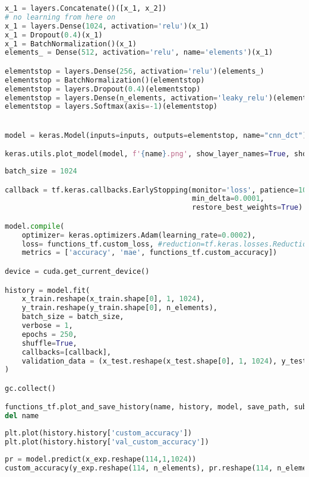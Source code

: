 \begin{lstlisting}[language=Python]
x_1 = layers.Concatenate()([x_1, x_2])
# no learning from here on
x_1 = layers.Dense(1024, activation='relu')(x_1)
x_1 = Dropout(0.4)(x_1)
x_1 = BatchNormalization()(x_1)
elements_ = Dense(512, activation='relu', name='elements')(x_1)

elementstop = layers.Dense(256, activation='relu')(elements_)
elementstop = BatchNormalization()(elementstop)
elementstop = layers.Dropout(0.4)(elementstop)
elementstop = layers.Dense(n_elements, activation='leaky_relu')(elementstop)
elementstop = layers.Softmax(axis=-1)(elementstop)


model = keras.Model(inputs=inputs, outputs=elementstop, name="cnn_dct")

keras.utils.plot_model(model, f'{name}.png', show_layer_names=True, show_layer_activations=True, show_shapes=True)
\end{lstlisting}

\begin{lstlisting}[language=Python]
batch_size = 1024

callback = tf.keras.callbacks.EarlyStopping(monitor='loss', patience=10,
                                            min_delta=0.0001,
                                            restore_best_weights=True)

model.compile(
    optimizer= keras.optimizers.Adam(learning_rate=0.0002),
    loss= functions_tf.custom_loss, #reduction=tf.keras.losses.Reduction.SUM
    metrics = ['accuracy', 'mae', functions_tf.custom_accuracy])

device = cuda.get_current_device()

history = model.fit(
    x_train.reshape(x_train.shape[0], 1, 1024),
    y_train.reshape(y_train.shape[0], n_elements),
    batch_size = batch_size,
    verbose = 1,
    epochs = 250,
    shuffle=True,
    callbacks=[callback],
    validation_data = (x_test.reshape(x_test.shape[0], 1, 1024), y_test.reshape(y_test.shape[0], n_elements))
)

gc.collect()

functions_tf.plot_and_save_history(name, history, model, save_path, subfolder='DCT', plot_acc=False)
del name
\end{lstlisting}

\begin{lstlisting}[language=Python]
plt.plot(history.history['custom_accuracy'])
plt.plot(history.history['val_custom_accuracy'])
\end{lstlisting}

\begin{lstlisting}[language=Python]
pr = model.predict(x_exp.reshape(114,1,1024))
custom_accuracy(y_exp.reshape(114, n_elements), pr.reshape(114, n_elements)).numpy()*100
\end{lstlisting}

